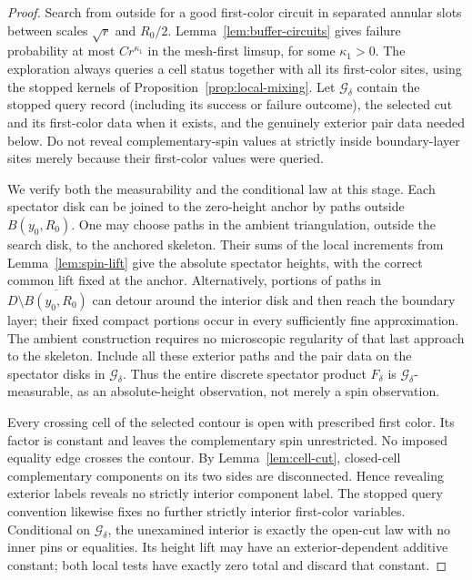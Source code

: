 \documentclass[11pt]{article}
\theoremstyle{definition}
\theoremstyle{remark}
\numberwithin{equation}{section}
\begin{document}
\begin{proof}
Search from outside for a good first-color circuit in separated
annular slots between scales \(\sqrt r\) and \(R_0/2\).
Lemma~\ref{lem:buffer-circuits} gives failure probability at most
\(Cr^{\kappa_1}\) in the mesh-first limsup, for some
\(\kappa_1>0\).  The exploration always queries a cell status
together with all its first-color sites, using the stopped kernels
of Proposition~\ref{prop:local-mixing}.  Let
\(\mathcal G_\delta\) contain the stopped query record (including its
success or failure outcome), the selected cut and its first-color data
when it exists, and the genuinely exterior pair data needed below.
Do not reveal complementary-spin values at strictly
inside boundary-layer sites merely because their first-color values
were queried.

We verify both the measurability and the conditional law at this
stage.  Each spectator disk can be joined to the zero-height anchor
by paths outside \(B(y_0,R_0)\).  One may choose paths in the ambient
triangulation, outside the search disk, to the anchored skeleton.
Their sums of the local increments from Lemma~\ref{lem:spin-lift}
give the absolute spectator heights, with the correct common lift
fixed at the anchor.  Alternatively, portions of paths in
\(D\setminus\overline{B(y_0,R_0)}\) can detour around the interior
disk and then reach the boundary layer; their fixed compact
portions occur in every sufficiently fine approximation.
The ambient construction requires no microscopic regularity of that
last approach to the skeleton.  Include all these exterior paths
and the pair data on the spectator disks in \(\mathcal G_\delta\).
Thus the entire discrete spectator product \(F_\delta\) is
\(\mathcal G_\delta\)-measurable, as an absolute-height observation,
not merely a spin observation.

Every crossing cell of the selected contour is open with prescribed
first color.  Its factor is constant and leaves the complementary
spin unrestricted.  No imposed equality edge crosses the contour.
By Lemma~\ref{lem:cell-cut}, closed-cell complementary components
on its two sides are disconnected.  Hence revealing exterior labels
reveals no strictly interior component label.
The stopped query convention likewise fixes no further strictly
interior first-color variables.  Conditional on
\(\mathcal G_\delta\), the unexamined interior is exactly the
open-cut law with no inner pins or equalities.
Its height lift may have an exterior-dependent additive constant;
both local tests have exactly zero total and discard that constant.


\end{proof}
\end{document}
